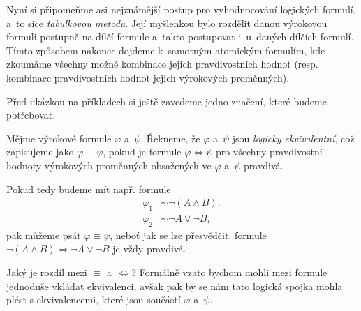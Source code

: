 Nyní si připomeňme asi nejznámější postup pro vyhodnocování logických formulí, a~to sice \emph{tabulkovou metodu}. Její myšlenkou bylo rozdělit danou výrokovou formuli postupně na dílčí formule a~takto postupovat i~u~daných dílčích formulí. Tímto způsobem nakonec dojdeme k~samotným atomickým formulím, kde zkoumáme všechny možné kombinace jejich pravdivostních hodnot (resp. kombinace pravdivostních hodnot jejich výrokových proměnných).\par
Před ukázkou na příkladech si ještě zavedeme jedno značení, které budeme potřebovat.
\begin{definition}
    Mějme výrokové formule $\varphi$ a~$\psi$. Řekneme, že $\varphi$ a~$\psi$ jsou \emph{logicky ekvivalentní}, což zapisujeme jako $\varphi\equiv\psi$, pokud je formule $\varphi \iff \psi$ pro všechny pravdivostní hodnoty výrokových proměnných obsažených ve $\varphi$ a~$\psi$ pravdivá.
\end{definition}
Pokud tedy budeme mít např. formule
\begin{align*}
    \varphi_1 &\sim \neg (A \land B),\\
    \varphi_2 &\sim \neg A \lor \neg B,
\end{align*}
pak můžeme psát $\varphi\equiv\psi$, neboť jak se lze přesvědčit, formule $\neg (A \land B) \iff \neg A \lor \neg B$ je vždy pravdivá.\par
Jaký je rozdíl mezi $\equiv$ a~$\iff$? Formálně vzato bychom mohli mezi formule jednoduše vkládat ekvivalenci, avšak pak by se nám tato logická spojka mohla plést s ekvivalencemi, které jsou součástí $\varphi$ a~$\psi$.
